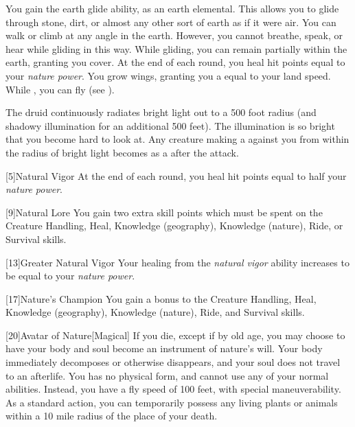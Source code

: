             You gain the earth glide ability, as an earth elemental.
            This allows you to glide through stone, dirt, or almost any other sort of earth as if it were air.
            You can walk or climb at any angle in the earth.
            However, you cannot breathe, speak, or hear while gliding in this way.
            While gliding, you can remain partially within the earth, granting you cover.
            At the end of each round, you heal hit points equal to your \textit{nature power}.
            You grow wings, granting you a  equal to your land speed.
            While , you can fly (see ).

            The druid continuously radiates bright light out to a 500 foot radius (and shadowy illumination for an additional 500 feet).
            The illumination is so bright that you become hard to look at.
            Any creature making a  against you from within the radius of bright light becomes \dazzled as a  after the attack.

            [5]{Natural Vigor}
            At the end of each round, you heal hit points equal to half your \textit{nature power}.

            [9]{Natural Lore}
            You gain two extra skill points which must be spent on the Creature Handling, Heal, Knowledge (geography), Knowledge (nature), Ride, or Survival skills.

            [13]{Greater Natural Vigor}
            Your healing from the \textit{natural vigor} ability increases to be equal to your \textit{nature power}.

            [17]{Nature's Champion}
            You gain a  bonus to the Creature Handling, Heal, Knowledge (geography), Knowledge (nature), Ride, and Survival skills.

            [20]{Avatar of Nature}[Magical]
            If you die, except if by old age, you may choose to have your body and soul become an instrument of nature's will.
            Your body immediately decomposes or otherwise disappears, and your soul does not travel to an afterlife.
            You has no physical form, and cannot use any of your normal abilities.
            Instead, you have a fly speed of 100 feet, with special maneuverability.
            As a standard action, you can temporarily possess any living plants or animals within a 10 mile radius of the place of your death.

